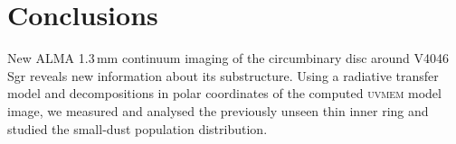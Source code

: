 \documentclass[letters,usenatbib,times]{mnras}
\begin{document}


\section{Conclusions} \label{sec:Conclusions}

New ALMA 1.3\,mm continuum imaging of the circumbinary disc around V4046\,Sgr reveals new information about its substructure. Using a radiative transfer model and decompositions in polar coordinates of the computed \textsc{uvmem} model image, we measured and analysed the previously unseen thin inner ring and studied the small-dust population distribution.
\end{document}
